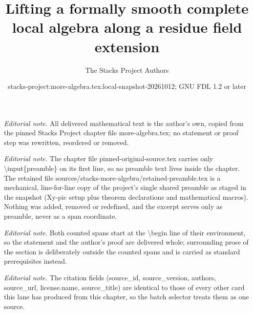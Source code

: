 \documentclass[10pt,a4paper]{amsart}
\title{Lifting a formally smooth complete local algebra along a residue field extension}
\author{The Stacks Project Authors}
\date{stacks-project:more-algebra.tex:local-snapshot-20261012; GNU FDL 1.2 or later}
\theoremstyle{plain}
\theoremstyle{definition}
\theoremstyle{remark}
\numberwithin{equation}{subsection}
\begin{document}
\maketitle
\setcounter{subsection}{1}
\noindent\textit{Editorial note.} All delivered mathematical text is the author's own, copied from the pinned Stacks Project chapter file more-algebra.tex; no statement or proof step was rewritten, reordered or removed.\par\medskip
\noindent\textit{Editorial note.} The chapter file pinned-original-source.tex carries only \textbackslash{}input\{preamble\} on its first line, so no preamble text lives inside the chapter. The retained file sources/stacks-more-algebra/retained-preamble.tex is a mechanical, line-for-line copy of the project's single shared preamble as staged in the snapshot (Xy-pic setup plus theorem declarations and mathematical macros). Nothing was added, removed or redefined, and the excerpt serves only as preamble, never as a span coordinate.\par\medskip
\noindent\textit{Editorial note.} Both counted spans start at the \textbackslash{}begin line of their environment, so the statement and the author's proof are delivered whole; surrounding prose of the section is deliberately outside the counted spans and is carried as standard prerequisites instead.\par\medskip
\noindent\textit{Editorial note.} The citation fields (source\_id, source\_version, authors, source\_url, license.name, source\_title) are identical to those of every other card this lane has produced from this chapter, so the batch selector treats them as one source.\par\medskip
\end{document}

